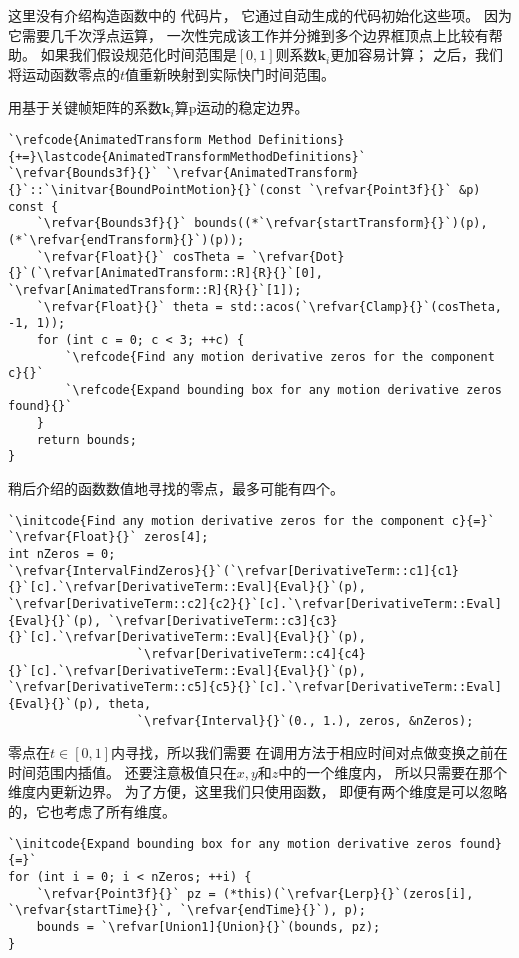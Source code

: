 这里没有介绍构造函数中的
代码片，
它通过自动生成的代码初始化这些项。
因为它需要几千次浮点运算，
一次性完成该工作并分摊到多个边界框顶点上比较有帮助。
如果我们假设规范化时间范围是$[0,1]$则系数$\bm k_i$更加容易计算；
之后，我们将运动函数零点的$t$值重新映射到实际快门时间范围。

用基于关键帧矩阵的系数$\bm k_i$算{\ttfamily p}运动的稳定边界。
\begin{lstlisting}
`\refcode{AnimatedTransform Method Definitions}{+=}\lastcode{AnimatedTransformMethodDefinitions}`
`\refvar{Bounds3f}{}` `\refvar{AnimatedTransform}{}`::`\initvar{BoundPointMotion}{}`(const `\refvar{Point3f}{}` &p) const {
    `\refvar{Bounds3f}{}` bounds((*`\refvar{startTransform}{}`)(p), (*`\refvar{endTransform}{}`)(p));
    `\refvar{Float}{}` cosTheta = `\refvar{Dot}{}`(`\refvar[AnimatedTransform::R]{R}{}`[0], `\refvar[AnimatedTransform::R]{R}{}`[1]);
    `\refvar{Float}{}` theta = std::acos(`\refvar{Clamp}{}`(cosTheta, -1, 1));
    for (int c = 0; c < 3; ++c) {
        `\refcode{Find any motion derivative zeros for the component c}{}`
        `\refcode{Expand bounding box for any motion derivative zeros found}{}`
    }
    return bounds;
}
\end{lstlisting}

稍后介绍的函数数值地寻找的零点，最多可能有四个。
\begin{lstlisting}
`\initcode{Find any motion derivative zeros for the component c}{=}`
`\refvar{Float}{}` zeros[4];
int nZeros = 0;
`\refvar{IntervalFindZeros}{}`(`\refvar[DerivativeTerm::c1]{c1}{}`[c].`\refvar[DerivativeTerm::Eval]{Eval}{}`(p), `\refvar[DerivativeTerm::c2]{c2}{}`[c].`\refvar[DerivativeTerm::Eval]{Eval}{}`(p), `\refvar[DerivativeTerm::c3]{c3}{}`[c].`\refvar[DerivativeTerm::Eval]{Eval}{}`(p),
                  `\refvar[DerivativeTerm::c4]{c4}{}`[c].`\refvar[DerivativeTerm::Eval]{Eval}{}`(p), `\refvar[DerivativeTerm::c5]{c5}{}`[c].`\refvar[DerivativeTerm::Eval]{Eval}{}`(p), theta,
                  `\refvar{Interval}{}`(0., 1.), zeros, &nZeros);
\end{lstlisting}

零点在$t\in[0,1]$内寻找，所以我们需要
在调用方法于相应时间对点做变换之前在时间范围内插值。
还要注意极值只在$x,y$和$z$中的一个维度内，
所以只需要在那个维度内更新边界。
为了方便，这里我们只使用函数，
即便有两个维度是可以忽略的，它也考虑了所有维度。
\begin{lstlisting}
`\initcode{Expand bounding box for any motion derivative zeros found}{=}`
for (int i = 0; i < nZeros; ++i) {
    `\refvar{Point3f}{}` pz = (*this)(`\refvar{Lerp}{}`(zeros[i], `\refvar{startTime}{}`, `\refvar{endTime}{}`), p);
    bounds = `\refvar[Union1]{Union}{}`(bounds, pz);
}
\end{lstlisting}

